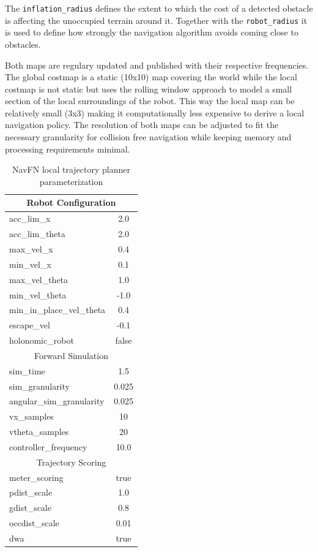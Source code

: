 \documentclass[10pt,journal,compsoc]{IEEEtran}
\begin{document}
The \texttt{inflation\_radius} defines the extent to which the cost of a detected obstacle is affecting the unoccupied terrain around it.
Together with the \texttt{robot\_radius} it is used to define how strongly the navigation algorithm avoids coming close to obstacles.

Both maps are regulary updated and published with their respective frequencies.
The global costmap is a static (10x10) map covering the world while the local costmap is not static but uses the rolling window approach to model a small section of the local surroundings of the robot.
This way the local map can be relatively small (3x3) making it computationally less expensive to derive a local navigation policy. 
The resolution of both maps can be adjusted to fit the necessary granularity for collision free navigation while keeping memory and processing requirements minimal.


\begin{table}[h]
      \caption{NavFN local trajectory planner parameterization}
      \label{tab:planner_parameterization}
      \begin{center}
            \begin{tabular}{|l|c|}
      \multicolumn{2}{c}{Robot Configuration} \\ \hline
      acc\_lim\_x & 2.0 \\ \hline
      acc\_lim\_theta & 2.0 \\ \hline
      max\_vel\_x & 0.4 \\ \hline
      min\_vel\_x & 0.1 \\ \hline
      max\_vel\_theta & 1.0 \\ \hline
      min\_vel\_theta & -1.0  \\ \hline
      min\_in\_place\_vel\_theta & 0.4 \\ \hline
      escape\_vel & -0.1 \\ \hline
      holonomic\_robot & false \\ \hline

      \multicolumn{2}{c}{Forward Simulation} \\ \hline
      sim\_time & 1.5 \\ \hline
      sim\_granularity & 0.025 \\ \hline
      angular\_sim\_granularity & 0.025\\ \hline
      vx\_samples & 10 \\ \hline
      vtheta\_samples & 20 \\ \hline
      controller\_frequency & 10.0 \\ \hline

      \multicolumn{2}{c}{Trajectory Scoring} \\ \hline
      meter\_scoring & true \\ \hline
      pdist\_scale & 1.0 \\ \hline
      gdist\_scale & 0.8 \\ \hline
      occdist\_scale & 0.01 \\ \hline
      dwa & true \\ \hline
            \end{tabular}
      \end{center}
\end{table}                  
\end{document}
